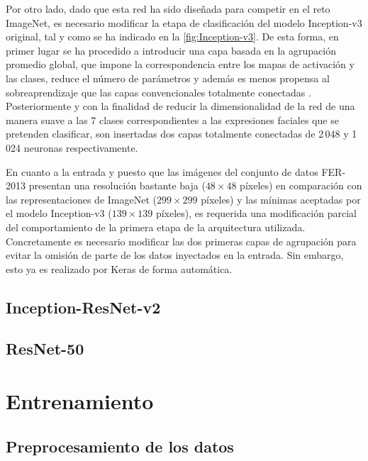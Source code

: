 Por otro lado, dado que esta red ha sido diseñada para competir en el reto ImageNet, es necesario modificar la etapa de clasificación del modelo Inception-v3 original, tal y como se ha indicado en la \autoref{fig:Inception-v3}. De esta forma, en primer lugar se ha procedido a introducir una capa basada en la agrupación promedio global, que impone la correspondencia entre los mapas de activación y las clases, reduce el número de parámetros y además es menos propensa al sobreaprendizaje que las capas convencionales totalmente conectadas \cite{NetworkInNetwork}. Posteriormente y con la finalidad de reducir la dimensionalidad de la red de una manera suave a las 7 clases correspondientes a las expresiones faciales que se pretenden clasificar, son insertadas dos capas totalmente conectadas de 2\,048 y 1\,024 neuronas respectivamente.

En cuanto a la entrada y puesto que las imágenes del conjunto de datos FER-2013 presentan una resolución bastante baja ($48\times 48$ píxeles) en comparación con las representaciones de ImageNet ($299\times 299$ píxeles) y las mínimas aceptadas por el modelo Inception-v3 ($139\times 139$ píxeles), es requerida una modificación parcial del comportamiento de la primera etapa de la arquitectura utilizada. Concretamente es necesario modificar las dos primeras capas de agrupación para evitar la omisión de parte de los datos inyectados en la entrada. Sin embargo, esto ya es realizado por Keras de forma automática.

\subsection{Inception-ResNet-v2}


\cite{Inception-ResNet}


\subsection{ResNet-50}

\cite{ResNet}

\section{Entrenamiento}

\subsection{Preprocesamiento de los datos}

